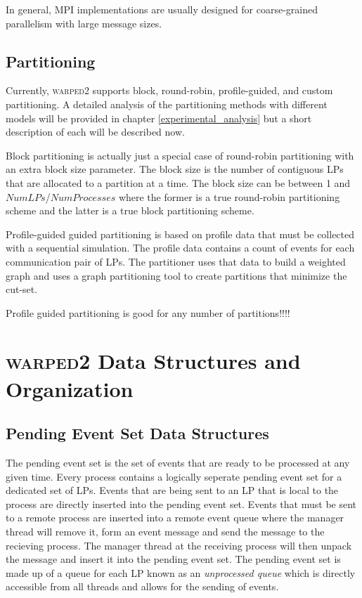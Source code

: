 \documentclass[11pt]{book}
\begin{document}
In general, MPI implementations are usually designed for coarse-grained parallelism with large
message sizes.

\section{Partitioning}

Currently, \textsc{warped2} supports block, round-robin, profile-guided, and custom partitioning.
A detailed analysis of the partitioning methods with different models will be provided in
chapter \ref{experimental_analysis} but a short description of each will be described now. 

Block partitioning is actually just a special case of round-robin partitioning with an extra
block size parameter. The block size is the number of contiguous LPs that are allocated to a
partition at a time. The block size can be between 1 and $NumLPs$/$NumProcesses$ where the
former is a true round-robin partitioning scheme and the latter is a true block partitioning
scheme.

Profile-guided guided partitioning is based on profile data that must be collected with a
sequential simulation. The profile data contains a count of events for each communication pair
of LPs. The partitioner uses that data to build a weighted graph and uses a graph partitioning
tool to create partitions that minimize the cut-set.

Profile guided partitioning is good for any number of partitions!!!!



\chapter{\textsc{warped2} Data Structures and Organization}\label{warped2_ds}

\section{Pending Event Set Data Structures}

The pending event set is the set of events that are ready to be processed at any given time.
Every process contains a logically seperate pending event set for a dedicated set of LPs. Events
that are being sent to an LP that is local to the process are directly inserted into the pending
event set. Events that must be sent to a remote process are inserted into a remote event
queue where the manager thread will remove it, form an event message and send the message to
the recieving process. The manager thread at the receiving process will then unpack the message
and insert it into the pending event set. The pending event set is made up of a queue for each
LP known as an \emph{unprocessed queue} which is directly accessible from all threads and allows
for the sending of events.
\end{document}
